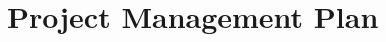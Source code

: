 \documentclass[preprint]{aastex}
\begin{document}
%

%
%
%
%
%
%
%

\vspace{-0.25in}
\section{Project Management Plan}
\label{PMPsec}
\end{document}
